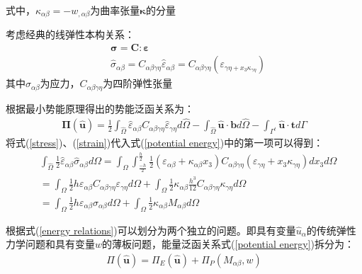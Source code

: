 式中，$\kappa_{\alpha\beta}=-w_{,\alpha\beta}$为曲率张量$\pmb{\kappa}$的分量\par
考虑经典的线弹性本构关系：
\begin{equation}\label{stress}
\begin{split}
    &\pmb{\sigma}=\pmb{C}\pmb{:}\pmb{\varepsilon}\\
    &\hat{\sigma}_{\alpha\beta}=C_{\alpha\beta\gamma\eta}\hat{\varepsilon}_{\alpha\beta}=C_{\alpha\beta\gamma\eta}(\varepsilon_{\gamma\eta+x_3\kappa_{\gamma\eta}})
\end{split}
\end{equation}
其中$\hat{\sigma}_{\alpha\beta}$为应力，$C_{\alpha\beta\gamma\eta}$为四阶弹性张量\par
根据最小势能原理得出的势能泛函关系为：
\begin{equation}\label{potential energy}
\begin{split}
    \pmb{\Pi}(\hat{\pmb{u}})=\frac{1}{2}\int_{\hat{\Omega}}\hat{\varepsilon}_{\alpha\beta}C_{\alpha\beta\gamma\eta}\hat{\varepsilon}_{\gamma\eta}d\hat{\Omega}-\int_{\hat{\Omega}}\hat{\pmb{u}}\cdot\pmb{b}d\hat{\Omega}-\int_{\Gamma^t}\hat{\pmb{u}}\cdot\pmb{t}d\Gamma
\end{split}
\end{equation}
将式(\ref{stress})、(\ref{strain})代入式(\ref{potential energy})中的第一项可以得到：
\begin{equation}\label{energy relations}
\begin{split}
&\int_{\hat{\Omega}}\frac{1}{2}\hat{\varepsilon}_{\alpha\beta}\hat{\sigma}_{\alpha\beta}d\Omega=\int_{\Omega}\int_{\frac{-h}{2}}^{\frac{h}{2}}\frac{1}{2}(\varepsilon_{\alpha\beta}+\kappa_{\alpha\beta}x_3)C_{\alpha\beta\gamma\eta}(\varepsilon_{\gamma\eta}+x_3\kappa_{\gamma\eta})dx_3d\Omega\\
&=\int_{\Omega}\frac{1}{2}h\varepsilon_{\alpha\beta}C_{\alpha\beta\gamma\eta}\varepsilon_{\gamma\eta}d\Omega+\int_{\Omega}\frac{1}{2}\kappa_{\alpha\beta}\frac{h^3}{12}C_{\alpha\beta\gamma\eta}\kappa_{\gamma\eta}d\Omega\\
&=\int_{\Omega}\frac{1}{2}h\varepsilon_{\alpha\beta}\sigma_{\alpha\beta}d\Omega+\int_{\Omega}\frac{1}{2}\kappa_{\alpha\beta}M_{\alpha\beta}d\Omega
\end{split}
\end{equation}\par
根据式(\ref{energy relations})可以划分为两个独立的问题。即具有变量$\hat{u}_{\alpha}$的传统弹性力学问题和具有变量$w$的薄板问题，能量泛函关系式(\ref{potential energy})拆分为：
\begin{equation}
\begin{split}
\Pi(\hat{\pmb{u}})=\Pi_E(\hat{\pmb{u}})+\Pi_P(M_{\alpha\beta},w)
\end{split}
\end{equation}
